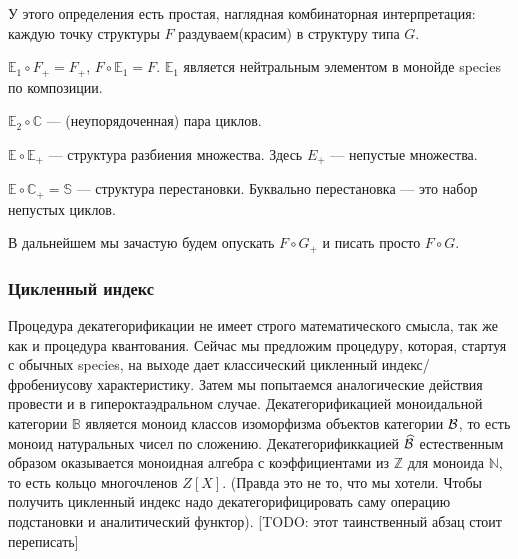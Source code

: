 У этого определения есть простая, наглядная
комбинаторная интерпретация: каждую точку структуры $F$ раздуваем(красим) в
структуру типа $G$.
\begin{example}
$\mathbb E_1 \circ F_{+} = F_{+}$, $F \circ \mathbb E_1 = F$. $\mathbb E_1$
является нейтральным элементом в монойде species по композиции.
\end{example}
\begin{example}
$\mathbb E_2 \circ \mathbb C$ --- (неупорядоченная) пара циклов.
\end{example}
\begin{example}
$\mathbb E \circ \mathbb E_{+}$ --- структура разбиения множества. Здесь $E_{+}$
--- непустые множества.
\end{example}
\begin{example}
$\mathbb E \circ \mathbb C_{+} = \mathbb S$ --- структура перестановки.
Буквально перестановка --- это набор непустых циклов.
\end{example}

В дальнейшем мы зачастую будем опускать $F \circ G_{+}$ и писать просто $F
\circ G$.

\subsubsection{Цикленный индекс}
Процедура декатегорификации не имеет строго математического смысла, так же как и процедура квантования.
Сейчас мы предложим процедуру, которая, стартуя с обычных species,
на выходе дает классический цикленный индекс/фробениусову характеристику.
Затем мы попытаемся аналогические действия провести и в гипероктаэдральном случае.
Декатегорификацией моноидальной категории $\mathbb B$ является моноид классов изоморфизма объектов категории
$\mathbb {\mathcal B}$, то есть моноид натуральных чисел по сложению.
Декатегорификкацией $\widehat{\mathbb {\mathcal B}}$ естественным образом оказывается
моноидная алгебра с коэффициентами из $\mathbb Z$ для моноида $\mathbb N$, то есть кольцо многочленов $Z[X]$.
(Правда это не то, что мы хотели. Чтобы получить цикленный индекс надо декатегорифицировать
саму операцию подстановки и аналитический функтор). [TODO: этот таинственный
абзац стоит переписать]

